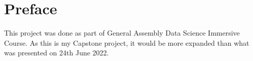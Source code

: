 \chapter{Preface}
This project was done as part of General Assembly Data Science Immersive Course. As this is my Capstone project, it would be more expanded than what was presented on 24th June 2022.